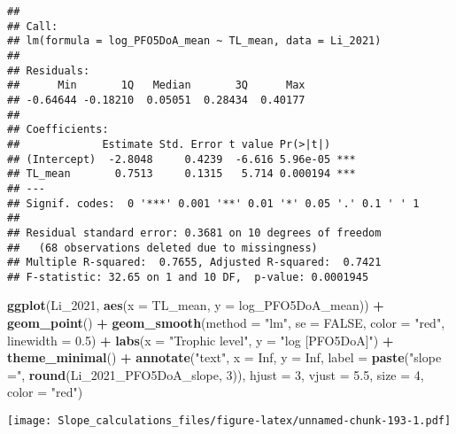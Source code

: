 \documentclass[
]{article}
\newenvironment{Shaded}{\begin{snugshade}}{\end{snugshade}}
\newcommand{\AttributeTok}[1]{\textcolor[rgb]{0.13,0.29,0.53}{#1}}
\newcommand{\ConstantTok}[1]{\textcolor[rgb]{0.56,0.35,0.01}{#1}}
\newcommand{\DecValTok}[1]{\textcolor[rgb]{0.00,0.00,0.81}{#1}}
\newcommand{\FloatTok}[1]{\textcolor[rgb]{0.00,0.00,0.81}{#1}}
\newcommand{\FunctionTok}[1]{\textcolor[rgb]{0.13,0.29,0.53}{\textbf{#1}}}
\newcommand{\NormalTok}[1]{#1}
\newcommand{\SpecialCharTok}[1]{\textcolor[rgb]{0.81,0.36,0.00}{\textbf{#1}}}
\newcommand{\StringTok}[1]{\textcolor[rgb]{0.31,0.60,0.02}{#1}}
\begin{document}
\begin{verbatim}
## 
## Call:
## lm(formula = log_PFO5DoA_mean ~ TL_mean, data = Li_2021)
## 
## Residuals:
##      Min       1Q   Median       3Q      Max 
## -0.64644 -0.18210  0.05051  0.28434  0.40177 
## 
## Coefficients:
##             Estimate Std. Error t value Pr(>|t|)    
## (Intercept)  -2.8048     0.4239  -6.616 5.96e-05 ***
## TL_mean       0.7513     0.1315   5.714 0.000194 ***
## ---
## Signif. codes:  0 '***' 0.001 '**' 0.01 '*' 0.05 '.' 0.1 ' ' 1
## 
## Residual standard error: 0.3681 on 10 degrees of freedom
##   (68 observations deleted due to missingness)
## Multiple R-squared:  0.7655, Adjusted R-squared:  0.7421 
## F-statistic: 32.65 on 1 and 10 DF,  p-value: 0.0001945
\end{verbatim}

\begin{Shaded}
\begin{Highlighting}[]
\FunctionTok{ggplot}\NormalTok{(Li\_2021, }\FunctionTok{aes}\NormalTok{(}\AttributeTok{x =}\NormalTok{ TL\_mean, }\AttributeTok{y =}\NormalTok{ log\_PFO5DoA\_mean)) }\SpecialCharTok{+}
  \FunctionTok{geom\_point}\NormalTok{() }\SpecialCharTok{+}
  \FunctionTok{geom\_smooth}\NormalTok{(}\AttributeTok{method =} \StringTok{"lm"}\NormalTok{, }\AttributeTok{se =} \ConstantTok{FALSE}\NormalTok{, }\AttributeTok{color =} \StringTok{"red"}\NormalTok{, }\AttributeTok{linewidth =} \FloatTok{0.5}\NormalTok{) }\SpecialCharTok{+}
  \FunctionTok{labs}\NormalTok{(}\AttributeTok{x =} \StringTok{"Trophic level"}\NormalTok{,}
       \AttributeTok{y =} \StringTok{"log [PFO5DoA]"}\NormalTok{) }\SpecialCharTok{+}
  \FunctionTok{theme\_minimal}\NormalTok{() }\SpecialCharTok{+}
  \FunctionTok{annotate}\NormalTok{(}\StringTok{"text"}\NormalTok{, }\AttributeTok{x =} \ConstantTok{Inf}\NormalTok{, }\AttributeTok{y =} \ConstantTok{Inf}\NormalTok{, }\AttributeTok{label =} \FunctionTok{paste}\NormalTok{(}\StringTok{"slope ="}\NormalTok{, }\FunctionTok{round}\NormalTok{(Li\_2021\_PFO5DoA\_slope, }\DecValTok{3}\NormalTok{)), }
           \AttributeTok{hjust =} \DecValTok{3}\NormalTok{, }\AttributeTok{vjust =} \FloatTok{5.5}\NormalTok{, }\AttributeTok{size =} \DecValTok{4}\NormalTok{, }\AttributeTok{color =} \StringTok{"red"}\NormalTok{)}
\end{Highlighting}
\end{Shaded}

\texttt{[image: Slope\_calculations\_files/figure-latex/unnamed-chunk-193-1.pdf]}
\end{document}
